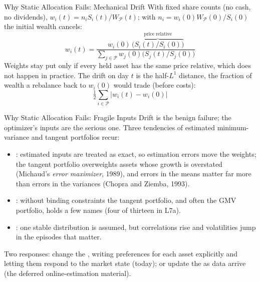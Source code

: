 \documentclass[aspectratio=169,11pt]{beamer}
\newcommand{\WP}{W_{\mathcal{P}}}
\begin{document}
\begin{frame}{Why Static Allocation Fails: Mechanical Drift}
  With fixed share counts (no cash, no dividends), $w_i(t)=n_iS_i(t)/\WP(t)$; with
  $n_i=w_i(0)\WP(0)/S_i(0)$ the initial wealth cancels:
  \[
    w_i(t)=\frac{w_i(0)\,\overbrace{\bigl(S_i(t)/S_i(0)\bigr)}^{\text{price relative}}}
      {\sum_{j\in\mathcal P}w_j(0)\bigl(S_j(t)/S_j(0)\bigr)}
  \]
  Weights stay put only if every held asset has the same price relative, which
  does not happen in practice. The drift on day $t$ is the half-$L^1$ distance,
  the fraction of wealth a rebalance back to $w_i(0)$ would trade (before costs):
  \[
    \tfrac12\sum_{i\in\mathcal P}\lvert w_i(t)-w_i(0)\rvert
  \]
\end{frame}

\begin{frame}{Why Static Allocation Fails: Fragile Inputs}
  Drift is the benign failure; the optimizer's inputs are the serious one. Three
  tendencies of estimated minimum-variance and tangent portfolios recur:
  \begin{itemize}\setlength{\itemsep}{0.45em}
    \item {}: estimated inputs are treated as exact, so
      estimation errors move the weights; the tangent portfolio overweights assets
      whose growth is overstated (Michaud's \emph{error maximizer}, 1989), and
      errors in the means matter far more than errors in the variances (Chopra and
      Ziemba, 1993).
    \item {}: without binding constraints the tangent
      portfolio, and often the GMV portfolio, holds a few names (four of thirteen
      in L7a).
    \item {}: one stable distribution is assumed, but
      correlations rise and volatilities jump in the episodes that matter.
  \end{itemize}
  Two responses: change the , writing preferences for each
  asset explicitly and letting them respond to the market state (today); or
  update the  as data arrive (the deferred online-estimation material).
\end{frame}
\end{document}
